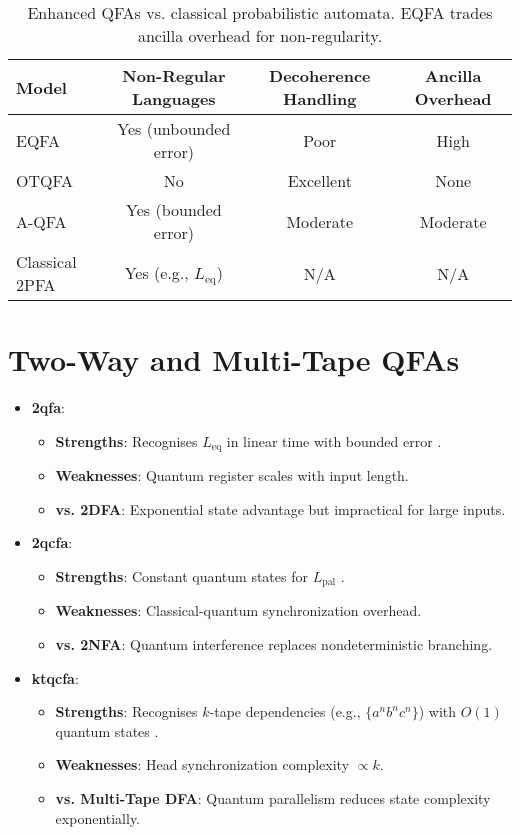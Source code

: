\begin{table}[ht]
\centering
\begin{tabular}{|l|c|c|c|}
\hline
\textbf{Model} & \textbf{Non-Regular Languages} & \textbf{Decoherence Handling} & \textbf{Ancilla Overhead} \\
\hline
EQFA & Yes (unbounded error) & Poor & High \\
OTQFA & No & Excellent & None \\
A-QFA & Yes (bounded error) & Moderate & Moderate \\
Classical 2PFA & Yes (e.g., \( L_{\text{eq}} \)) & N/A & N/A \\
\hline
\end{tabular}
\caption{Enhanced QFAs vs. classical probabilistic automata. EQFA trades ancilla overhead for non-regularity.}
\label{tab:enhanced-vs-classical}
\end{table}

\section{Two-Way and Multi-Tape QFAs}
\label{sec:two-way-comparison}

\begin{itemize}
    \item \textbf{\gls{2qfa}}:
    \begin{itemize}
        \item \textbf{Strengths}: Recognises \( L_{\text{eq}} \) in linear time with bounded error \cite{yakaryilmaz2010succinctness}.
        \item \textbf{Weaknesses}: Quantum register scales with input length.
        \item \textbf{vs. 2DFA}: Exponential state advantage but impractical for large inputs.
    \end{itemize}
    
    \item \textbf{\gls{2qcfa}}:
    \begin{itemize}
        \item \textbf{Strengths}: Constant quantum states for \( L_{\text{pal}} \) \cite{ambainis2002quantum}.
        \item \textbf{Weaknesses}: Classical-quantum synchronization overhead.
        \item \textbf{vs. 2NFA}: Quantum interference replaces nondeterministic branching.
    \end{itemize}
    
    \item \textbf{\gls{ktqcfa}}:
    \begin{itemize}
        \item \textbf{Strengths}: Recognises \( k \)-tape dependencies (e.g., \( \{a^n b^n c^n\} \)) with \( O(1) \) quantum states \cite{zheng2012two}.
        \item \textbf{Weaknesses}: Head synchronization complexity \( \propto k \).
        \item \textbf{vs. Multi-Tape DFA}: Quantum parallelism reduces state complexity exponentially.
    \end{itemize}
\end{itemize}

